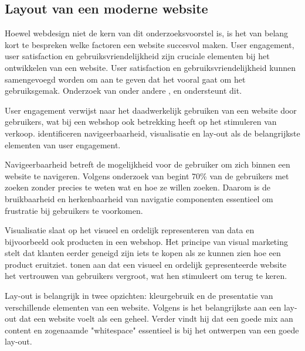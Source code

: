 \subsection{Layout van een moderne website}
\label{sec:Layout van een moderne website}

Hoewel webdesign niet de kern van dit onderzoeksvoorstel is, is het van belang kort te bespreken welke factoren een website succesvol maken. User engagement, user satisfaction en gebruiksvriendelijkheid zijn cruciale elementen bij het ontwikkelen van een website. User satisfaction en gebruiksvriendelijkheid kunnen samengevoegd worden om aan te geven dat het vooral gaat om het gebruiksgemak. Onderzoek van onder andere \textcite{vila2021indicators}, \textcite{saoula2023building} en \textcite{flavian2009web} ondersteunt dit.

\vspace{\baselineskip}

User engagement verwijst naar het daadwerkelijk gebruiken van een website door gebruikers, wat bij een webshop ook betrekking heeft op het stimuleren van verkoop. \textcite{garett2016literature} identificeren navigeerbaarheid, visualisatie en lay-out als de belangrijkste elementen van user engagement.

\vspace{\baselineskip}

Navigeerbaarheid betreft de mogelijkheid voor de gebruiker om zich binnen een website te navigeren. Volgens onderzoek van \textcite{vila2021indicators} begint 70\% van de gebruikers met zoeken zonder precies te weten wat en hoe ze willen zoeken. Daarom is de bruikbaarheid en herkenbaarheid van navigatie componenten essentieel om frustratie bij gebruikers te voorkomen.

\vspace{\baselineskip}

Visualisatie slaat op het visueel en ordelijk representeren van data en bijvoorbeeld ook producten in een webshop. Het principe van visual marketing stelt dat klanten eerder geneigd zijn iets te kopen als ze kunnen zien hoe een product eruitziet. \textcite{saoula2023building} tonen aan dat een visueel en ordelijk gepresenteerde website het vertrouwen van gebruikers vergroot, wat hen stimuleert om terug te keren.

\vspace{\baselineskip}

Lay-out is belangrijk in twee opzichten: kleurgebruik en de presentatie van verschillende elementen van een website. Volgens \textcite{beaird2020principles} is het belangrijkste aan een lay-out dat een website voelt als een geheel. Verder vindt hij dat een goede mix aan content en zogenaamde "whitespace" essentieel is bij het ontwerpen van een goede lay-out.


